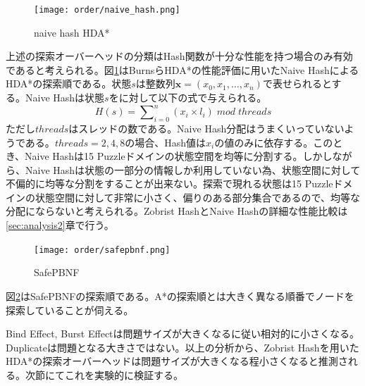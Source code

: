 \documentclass{jsarticle}
\begin{document}
\begin{figure}
	\centering
	\texttt{[image: order/naive\_hash.png]}
	\caption{naive hash HDA*}
	\label{fig:order_naive_hash}
\end{figure}
上述の探索オーバーヘッドの分類はHash関数が十分な性能を持つ場合のみ有効であると考えられる。図\ref{fig:order_naive_hash}はBurnsらHDA*の性能評価に用いたNaive HashによるHDA*の探索順である。状態$s$は整数列$\mathbf{x} = (x_{0}, x_{1}, …, x_{n})$で表せられるとする。Naive Hashは状態$s$をに対して以下の式で与えられる。
\newline
\begin{equation}
	H(s) = \sum\nolimits_{i = 0}^{n}(x_{i} \times l_{i})\; mod\; threads
\end{equation}
\newline
ただし$threads$はスレッドの数である。Naive Hash分配はうまくいっていないようである。$threads = 2, 4, 8$の場合、Hash値は$x_{i}$の値のみに依存する。このとき、Naive Hashは15 Puzzleドメインの状態空間を均等に分割する。しかしながら、Naive Hashは状態の一部分の情報しか利用していない為、状態空間に対して不偏的に均等な分割をすることが出来ない。探索で現れる状態は15 Puzzleドメインの状態空間に対して非常に小さく、偏りのある部分集合であるので、均等な分配にならないと考えられる。Zobrist HashとNaive Hashの詳細な性能比較は\ref{sec:analysis2}章で行う。

\begin{figure}
	\centering
	\texttt{[image: order/safepbnf.png]}
	\caption{SafePBNF}
	\label{fig:order_safepbnf}
\end{figure}

図\ref{fig:order_safepbnf}はSafePBNFの探索順である。A*の探索順とは大きく異なる順番でノードを探索していることが伺える。
\newline

Bind Effect, Burst Effectは問題サイズが大きくなるに従い相対的に小さくなる。Duplicateは問題となる大きさではない。以上の分析から、Zobrist Hashを用いたHDA*の探索オーバーヘッドは問題サイズが大きくなる程小さくなると推測される。次節にてこれを実験的に検証する。
\end{document}
